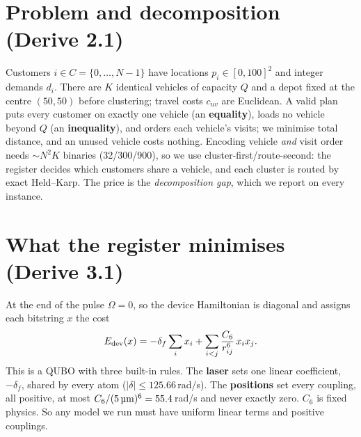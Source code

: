 \documentclass[9pt,twocolumn]{extarticle}
\begin{document}
\section{Problem and decomposition (Derive 2.1)}
Customers $i\in C=\{0,\dots,N-1\}$ have locations $p_i\in[0,100]^2$ and integer demands $d_i$. There are $K$ identical vehicles of capacity $Q$ and a depot fixed at the centre $(50,50)$ before clustering; travel costs $c_{uv}$ are Euclidean. A valid plan puts every customer on exactly one vehicle (an \textbf{equality}), loads no vehicle beyond $Q$ (an \textbf{inequality}), and orders each vehicle's visits; we minimise total distance, and an unused vehicle costs nothing. Encoding vehicle \emph{and} visit order needs $\sim N^2K$ binaries (32/300/900), so we use cluster-first/route-second: the register decides which customers share a vehicle, and each cluster is routed by exact Held--Karp. The price is the \emph{decomposition gap}, which we report on every instance.

\section{What the register minimises (Derive 3.1)}
At the end of the pulse $\Omega=0$, so the device Hamiltonian is diagonal and assigns each bitstring $x$ the cost
\begin{equation}
E_{\rm dev}(x)= -\delta_f\sum_i x_i+\sum_{i<j}\frac{C_6}{r_{ij}^6}\,x_ix_j .
\label{eq:dev}
\end{equation}
This is a QUBO with three built-in rules. The \textbf{laser} sets one linear coefficient, $-\delta_f$, shared by every atom ($|\delta|\le125.66$\,rad/\textmu s). The \textbf{positions} set every coupling, all positive, at most $C_6/(5\,\text{\textmu m})^6=55.4$\,rad/\textmu s and never exactly zero. $C_6$ is fixed physics. So any model we run must have uniform linear terms and positive couplings.
\end{document}

